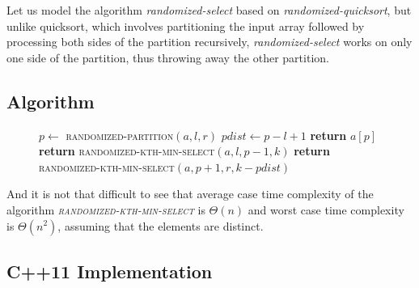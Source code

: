 Let us model the algorithm \emph{randomized-select} based on \emph{randomized-quicksort}, but unlike quicksort, which involves partitioning the input array followed by processing both sides of the partition recursively, \emph{randomized-select} works on only one side of the partition, thus throwing away the other partition.

\subsection*{Algorithm}

\begin{figure}[H]
\begin{center}
\end{center}
\begin{algorithmic}[1]
    \State $p \gets$ \textsc{randomized-partition}$(a, l, r)$
    \State $pdist \gets p - l + 1$
        \State \textbf{return} $a[p]$
        \State \textbf{return} \textsc{randomized-kth-min-select}$(a, l, p - 1, k)$
        \State \textbf{return} \textsc{randomized-kth-min-select}$(a, p + 1, r, k - pdist)$  
    \EndIf
\EndFunction
\end{algorithmic}
\end{figure}

And it is not that difficult to see that average case time complexity of the algorithm \emph{\textsc{randomized-kth-min-select}} is $\Theta(n)$ and worst case time complexity is $\Theta(n^{2})$, assuming that the elements are distinct.

\subsection*{C++11 Implementation}


